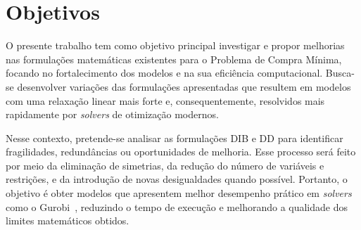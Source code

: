 \section{Objetivos}






O presente trabalho tem como objetivo principal investigar e propor melhorias nas formulações matemáticas existentes para o Problema de Compra Mínima, focando no fortalecimento dos modelos e na sua eficiência computacional. Busca-se desenvolver variações das formulações apresentadas que resultem em modelos com uma relaxação linear mais forte e, consequentemente, resolvidos mais rapidamente por \emph{solvers} de otimização modernos.

Nesse contexto, pretende-se analisar as formulações DIB e DD para identificar fragilidades, redundâncias ou oportunidades de melhoria. Esse processo será feito por meio da eliminação de simetrias, da redução do número de variáveis e restrições, e da introdução de novas desigualdades quando possível. Portanto, o objetivo é obter modelos que apresentem melhor desempenho prático em \emph{solvers} como o Gurobi~\cite{gurobi}, reduzindo o tempo de execução e melhorando a qualidade dos limites matemáticos obtidos.


